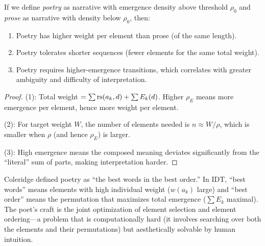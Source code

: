 \begin{theorem}
\label{thm:poetry-prose}
If we define \emph{poetry} as narrative with emergence density above threshold
$\rho_0$ and \emph{prose} as narrative with density below $\rho_0$, then:
\begin{enumerate}
  \item Poetry has higher weight per element than prose (of the same length).
  \item Poetry tolerates shorter sequences (fewer elements for the same total
        weight).
  \item Poetry requires higher-emergence transitions, which correlates with
        greater ambiguity and difficulty of interpretation.
\end{enumerate}
\end{theorem}

\begin{proof}
(1): Total weight $= \sum \mathrm{rs}(a_k, d) + \sum E_k(d)$.  Higher $\rho_E$
means more emergence per element, hence more weight per element.

(2): For target weight $W$, the number of elements needed is $n \approx W /
\rho$, which is smaller when $\rho$ (and hence $\rho_E$) is larger.

(3): High emergence means the composed meaning deviates significantly from
the ``literal'' sum of parts, making interpretation harder.
\end{proof}

\begin{interpretation}
\label{interp:coleridge}
Coleridge defined poetry as ``the best words in the best order.''  In IDT,
``best words'' means elements with high individual weight ($w(a_k)$ large)
and ``best order'' means the permutation that maximizes total emergence
($\sum E_k$ maximal).  The poet's craft is the joint optimization of element
selection and element ordering---a problem that is computationally hard
(it involves searching over both the elements and their permutations) but
aesthetically solvable by human intuition.
\end{interpretation}

